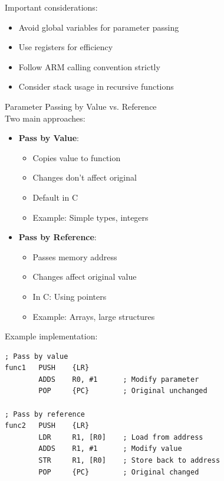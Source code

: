 \begin{remark}
Important considerations:
\begin{itemize}
  \item Avoid global variables for parameter passing
  \item Use registers for efficiency
  \item Follow ARM calling convention strictly
  \item Consider stack usage in recursive functions
\end{itemize}
\end{remark}

\begin{KR}{Parameter Passing by Value vs. Reference}\\
Two main approaches:
\begin{itemize}
  \item \textbf{Pass by Value}:
    \begin{itemize}
      \item Copies value to function
      \item Changes don't affect original
      \item Default in C
      \item Example: Simple types, integers
    \end{itemize}
  \item \textbf{Pass by Reference}:
    \begin{itemize}
      \item Passes memory address
      \item Changes affect original value
      \item In C: Using pointers
      \item Example: Arrays, large structures
    \end{itemize}
\end{itemize}

Example implementation:
\begin{lstlisting}[language=armasm, style=base]
; Pass by value
func1   PUSH    {LR}
        ADDS    R0, #1      ; Modify parameter
        POP     {PC}        ; Original unchanged

; Pass by reference
func2   PUSH    {LR}
        LDR     R1, [R0]    ; Load from address
        ADDS    R1, #1      ; Modify value
        STR     R1, [R0]    ; Store back to address
        POP     {PC}        ; Original changed
\end{lstlisting}
\end{KR}

